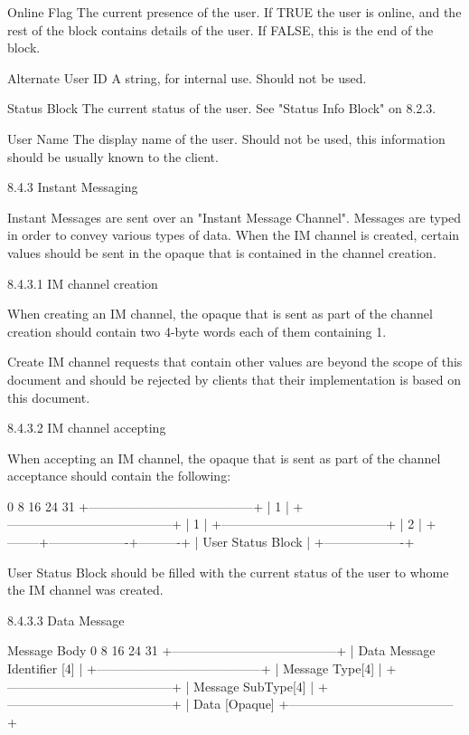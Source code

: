 \documentclass[titlepage,oneside]{book}
\begin{document}
Online Flag
  The current presence of the user. If TRUE the user is online, and
  the rest of the block contains details of the user. If FALSE, this
  is the end of the block.

Alternate User ID
  A string, for internal use. Should not be used.

Status Block
  The current status of the user. See "Status Info Block" on
  8.2.3.

User Name
  The display name of the user. Should not be used, this information
  should be usually known to the client.


8.4.3 Instant Messaging

Instant Messages are sent over an "Instant Message Channel". Messages
are typed in order to convey various types of data. When the IM channel
is created, certain values should be sent in the opaque that is
contained in the channel creation.

8.4.3.1 IM channel creation

When creating an IM channel, the opaque that is sent as part of the 
channel creation should contain two 4-byte words each of them 
containing 1.

Create IM channel requests that contain other values are beyond the
scope of this document and should be rejected by clients that their
implementation is based on this document.

8.4.3.2 IM channel accepting

When accepting an IM channel, the opaque that is sent as part of the
channel acceptance should contain the following:

0         8         16        24      31
+---------------------------------------+
|                  1                    |
+---------------------------------------+
|                  1                    |
+---------------------------------------+
|                  2                    |
+--------+-------------------+----------+
         | User Status Block |
         +-------------------+

User Status Block should be filled with the current status of the user
to whome the IM channel was created.

8.4.3.3 Data Message

Message Body
0         8         16        24      31
+---------------------------------------+
|       Data Message Identifier [4]     |
+---------------------------------------+
|            Message Type[4]            |
+---------------------------------------+
|          Message SubType[4]           |
+---------------------------------------+
|             Data [Opaque]
+---------------------------------------+
\end{document}
